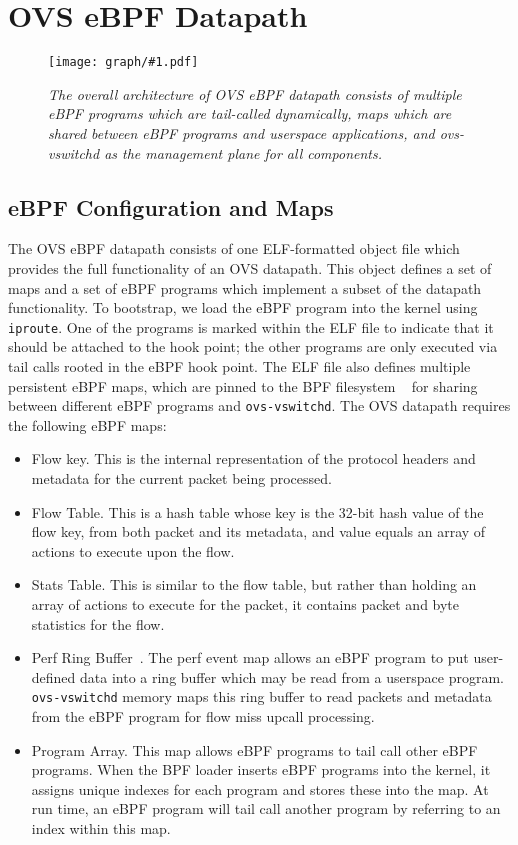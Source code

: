 \documentclass[10pt,numbers,reprint]{sigplanconf}
\newcommand{\myfigcross}[3]
{
\begin{figure*}[ht]
\centerline{\texttt{[image: graph/\#1.pdf]}}
\caption{\sl \small #3}
\label{#1:fig}
\vspace*{-0.15in}
\end{figure*}
}
\begin{document}
\section{OVS eBPF Datapath}
\label{sec:ebpf}
\myfigcross{ovsebpf}{5.5in}{The overall architecture of OVS eBPF datapath
consists of multiple eBPF programs which are tail-called dynamically, maps
which are shared between eBPF programs and userspace applications, and
ovs-vswitchd as the management plane for all components.}

\subsection{eBPF Configuration and Maps}
The OVS eBPF datapath consists of one ELF-formatted object file which provides
the full functionality of an OVS datapath. This object defines
a set of maps and a set of eBPF programs which implement a subset of
the datapath functionality.  To bootstrap, we load the eBPF program into
the kernel using \verb+iproute+. One of the programs is marked
within the ELF file to indicate that it should be
attached to the hook point; the other programs are only executed via tail
calls rooted in the eBPF hook point.  The ELF file also defines multiple persistent eBPF maps, which are
pinned to the BPF filesystem ~\cite{bpfpmap}
for sharing between different eBPF programs and \verb+ovs-vswitchd+.
The OVS datapath requires the following eBPF maps:
\begin{itemize}
\item Flow key. This is the internal representation of the protocol headers
    and metadata for the current packet being processed.
\item Flow Table. This is a hash table whose key is the 32-bit hash value
of the flow key, from both packet and its metadata,
and value equals an array of actions to execute upon the flow.
\item Stats Table. This is similar to the flow table, but rather than holding
an array of actions to execute for the packet, it contains packet and byte
statistics for the flow.
\item Perf Ring Buffer~\cite{ebpfperf,ebpfperf2}. The perf event map
allows an eBPF program to put user-defined data into a ring buffer which
may be read from a userspace program. \verb+ovs-vswitchd+ memory maps
this ring buffer to read packets and metadata from the eBPF program for
flow miss upcall processing.
\item Program Array. This map allows eBPF programs to tail call other eBPF
programs. When the BPF loader inserts eBPF programs into the kernel, it assigns
unique indexes for each program and stores these into the map.  At run time,
an eBPF program will tail call another program by referring to an index within
this map.
\end{itemize}
\end{document}
